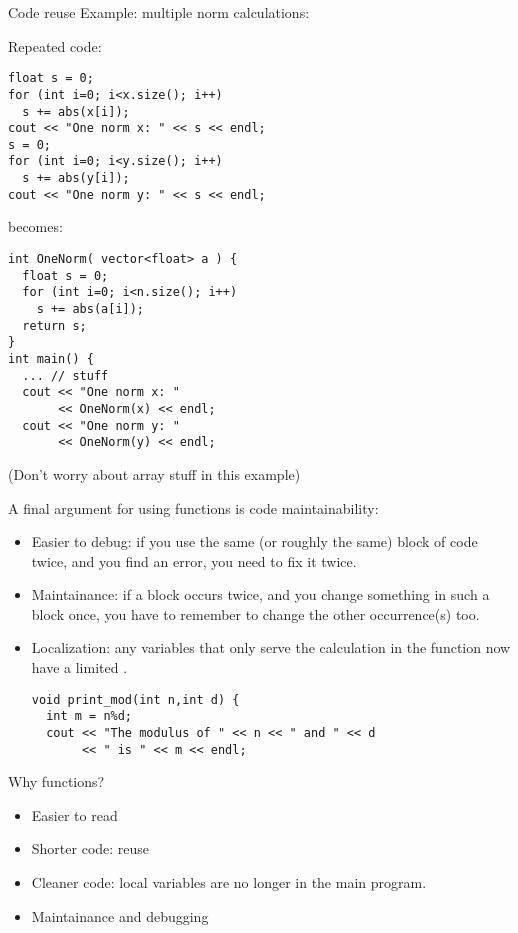 \begin{block}{Code reuse}
  \label{sl:function-reuse}
Example: multiple norm calculations:
  \begin{multicols}{2}
    \small
    Repeated code:
\begin{lstlisting}
float s = 0;
for (int i=0; i<x.size(); i++)
  s += abs(x[i]);
cout << "One norm x: " << s << endl;
s = 0;
for (int i=0; i<y.size(); i++)
  s += abs(y[i]);
cout << "One norm y: " << s << endl;
\end{lstlisting}
\vfill\columnbreak
becomes:
\begin{lstlisting}
int OneNorm( vector<float> a ) {
  float s = 0;
  for (int i=0; i<n.size(); i++)
    s += abs(a[i]);
  return s;
}
int main() {
  ... // stuff
  cout << "One norm x: "
       << OneNorm(x) << endl;
  cout << "One norm y: " 
       << OneNorm(y) << endl;
\end{lstlisting}
  \end{multicols}
  (Don't worry about array stuff in this example)
\end{block}

A final argument for using functions is code maintainability:
\begin{itemize}
\item Easier to debug: if you use the same (or roughly the same) block
  of code twice, and you find an error, you need to fix it twice.
\item Maintainance: if a block occurs twice, and  you change something in such a block
  once, you have to remember to change the other occurrence(s) too.
\item Localization: any variables that only serve the calculation in
  the function now have a limited .
\begin{lstlisting}
void print_mod(int n,int d) {
  int m = n%d;
  cout << "The modulus of " << n << " and " << d 
       << " is " << m << endl;
\end{lstlisting}
\end{itemize}

\begin{slide}{Why functions?}
  \label{sl:func-why}
  \begin{itemize}
  \item Easier to read
  \item Shorter code: reuse
  \item Cleaner code: local variables are no longer in the main program.
  \item Maintainance and debugging
  \end{itemize}
\end{slide}

